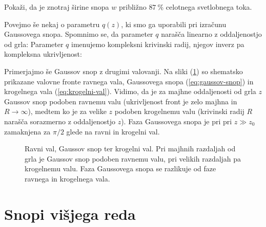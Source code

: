 \begin{definition}
\label{naloga-širina-snopa}
Pokaži, da je znotraj širine snopa $w$ približno $87~\%$ celotnega svetlobnega toka.
\end{definition}

Povejmo še nekaj o parametru $q(z)$, ki smo ga uporabili pri izračunu Gaussovega snopa. Spom\-nimo 
se, da parameter $q$ narašča linearno z oddaljenostjo od grla:
Parameter $q$ imenujemo kompleksni krivinski radij, 
njegov inverz pa kompleksna ukrivljenost: 

Primerjajmo še Gaussov snop z drugimi valovanji. Na sliki (\ref{fig:ravni-Gaussov-krogelni-val}) 
so shematsko prikazane valovne fronte ravnega vala, Gaussovega snopa (\ref{eq:gaussov-snop}) in krogelnega
vala (\ref{eq:krogelni-val}). Vidimo, da je za majhne oddaljenosti od grla $z$ Gaussov
snop podoben ravnemu valu (ukrivljenost front je zelo majhna in $R \to \infty$), 
medtem ko je za velike $z$ podoben krogelnemu valu (krivinski radij $R$ narašča sorazmerno z oddaljenostjo $z$). 
Faza Gaussovega snopa je pri pri $z\gg z_{0}$ zamaknjena za $\pi/2$ glede na ravni in 
krogelni val. 

\begin{figure}[h]
\centering
\def\svgwidth{90truemm} 

\caption{Ravni val, Gaussov snop ter
krogelni val. Pri majhnih razdaljah od grla je Gaussov snop podoben
ravnemu valu, pri velikih razdaljah pa krogelnemu valu. Faza Gaussovega snopa
se razlikuje od faze ravnega in krogelnega vala.}
\label{fig:ravni-Gaussov-krogelni-val}
\end{figure}

\section{Snopi višjega reda}

